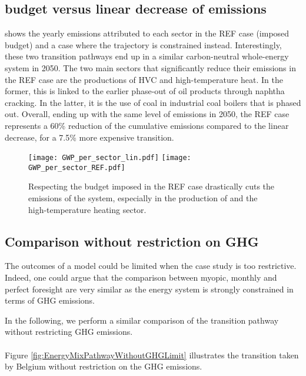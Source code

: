 \subsection{ budget versus linear decrease of emissions}
\label{app:CO2_budget}

 shows the yearly emissions attributed to each sector in the REF case (\ie imposed  budget) and a case where the  trajectory is constrained instead. Interestingly, these two transition pathways end up in a similar carbon-neutral whole-energy system in 2050. The two main sectors that significantly reduce their emissions in the REF case are the productions of \gls{HVC} and high-temperature heat. In the former, this is linked to the earlier phase-out of oil products through naphtha cracking. In the latter, it is the use of coal in industrial coal boilers that is phased out. Overall, ending up with the same level of emissions in 2050, the REF case represents a 60\% reduction of the cumulative emissions compared to the linear decrease, for a 7.5\% more expensive transition.

\begin{figure}[htbp!]
\centering
\texttt{[image: GWP\_per\_sector\_lin.pdf]}
\texttt{[image: GWP\_per\_sector\_REF.pdf]}
\caption{Respecting the  budget imposed in the REF case drastically cuts the emissions of the system, especially in the production of  and the high-temperature heating sector.}
\label{fig:app_CO2_REF_lin}
\end{figure}

\subsection{Comparison without restriction on \gls{GHG}}
\label{app:pfmomy_comparison_without_GHG}

The outcomes of a model could be limited when the case study is too restrictive. Indeed, one could argue that the comparison between myopic, monthly and perfect foresight are very similar as the energy system is strongly constrained in terms of \gls{GHG} emissions.

In the following, we perform a similar comparison of the transition pathway without restricting \gls{GHG} emissions. \\

\\

\noindent
Figure \ref{fig:EnergyMixPathwayWithoutGHGLimit} illustrates the transition taken by Belgium without restriction on the \gls{GHG} emissions. 


